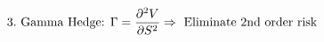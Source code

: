 \documentclass[preview]{standalone}
\begin{document}
\begin{align*}
\special{dvisvgm:raw <g id='unique000'>}3. \text{ Gamma Hedge: } \Gamma = \frac{\partial^2 V}{\partial S^2} \Rightarrow \text{ Eliminate 2nd order risk}\special{dvisvgm:raw </g>}
\end{align*}
\end{document}
